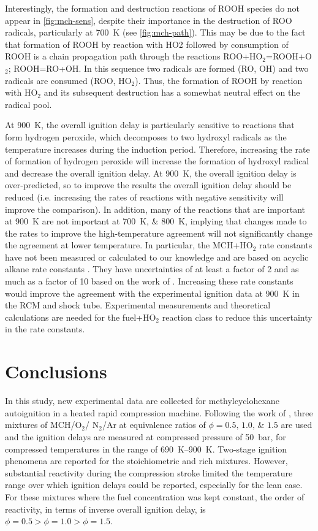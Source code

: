 \documentclass[12pt, letterpaper]{article}
\begin{document}
Interestingly, the formation and destruction reactions of ROOH species
do not appear in \autoref{fig:mch-sens}, despite their importance in
the destruction of ROO radicals, particularly at \SI{700}{\kelvin}
(see \autoref{fig:mch-path}). This may be due to the fact that
formation of ROOH by reaction with HO2 followed by consumption of ROOH
is a chain propagation path through the reactions ROO+HO$_2$=ROOH+O$_2$;
ROOH=RO+OH. In this sequence two radicals are formed (RO, OH) and two
radicals are consumed (ROO, HO$_2$). Thus, the formation of ROOH by
reaction with HO$_2$ and its subsequent destruction has a somewhat
neutral effect on the radical pool.

At \SI{900}{\kelvin}, the overall ignition delay is particularly sensitive
to reactions that form hydrogen peroxide, which decomposes to two
hydroxyl radicals as the temperature increases during the induction
period. Therefore, increasing the rate of formation of hydrogen peroxide
will increase the formation of hydroxyl radical and decrease the overall
ignition delay. At \SI{900}{\kelvin}, the overall ignition delay is
over-predicted, so to improve the results the overall ignition delay
should be reduced (i.e. increasing the rates of reactions with negative
sensitivity will improve the comparison). In addition, many of the
reactions that are important at \SI{900}{\kelvin} are not important at
\SIlist{700;800}{\kelvin}, implying that changes made to the rates to
improve the high-temperature agreement will not significantly change the
agreement at lower temperature. In particular, the MCH+HO$_2$ rate constants
have not been measured or calculated to our knowledge and are based
on acyclic alkane rate constants \cite{Aguilera-Iparraguirre2008}. They have uncertainties of at
least a factor of 2 and as much as a factor of 10 based on the work
of \textcite{Aguilera-Iparraguirre2008}. Increasing these rate constants
would improve the agreement with the experimental ignition data at
\SI{900}{\kelvin} in the RCM and shock tube. Experimental measurements
and theoretical calculations are needed for the fuel+HO$_2$ reaction class to
reduce this uncertainty in the rate constants.

\section{Conclusions}

In this study, new experimental data are collected for methylcyclohexane
autoignition in a heated rapid compression machine. Following the work
of \textcite{Mittal2009}, three mixtures of MCH/O$_2$/ N$_2$/Ar at equivalence
ratios of $\phi=\numlist{0.5;1.0;1.5}$ are used and the ignition delays
are measured at compressed pressure of \SI{50}{\bar}, for compressed
temperatures in the range of \SIrange{690}{900}{\kelvin}. Two-stage
ignition phenomena are reported for the stoichiometric and rich
mixtures. However, substantial reactivity during the compression
stroke limited the temperature range over which ignition delays could
be reported, especially for the lean case. For these mixtures where the
fuel concentration was kept constant, the order of reactivity, in terms
of inverse overall ignition delay, is $\phi=\num{0.5}>\phi=\num{1.0}>\phi=\num{1.5}$.
\end{document}
